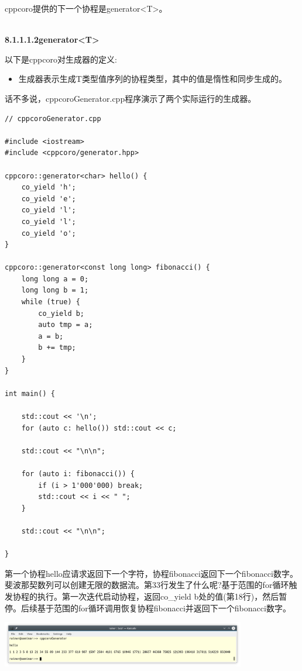 cppcoro提供的下一个协程是generator<T>。

\hspace*{\fill} \\ %
\noindent
\textbf{8.1.1.1.2\hspace{0.2cm}generator<T>}

以下是cppcoro对生成器的定义:

\begin{itemize}
\item 
生成器表示生成T类型值序列的协程类型，其中的值是惰性和同步生成的。
\end{itemize}

话不多说，cppcoroGenerator.cpp程序演示了两个实际运行的生成器。

\begin{lstlisting}[style=styleCXX]
// cppcoroGenerator.cpp

#include <iostream>
#include <cppcoro/generator.hpp>

cppcoro::generator<char> hello() {
	co_yield 'h';
	co_yield 'e';
	co_yield 'l';
	co_yield 'l';
	co_yield 'o';
}

cppcoro::generator<const long long> fibonacci() {
	long long a = 0;
	long long b = 1;
	while (true) {
		co_yield b;
		auto tmp = a;
		a = b;
		b += tmp;
	}
}

int main() {

	std::cout << '\n';
	for (auto c: hello()) std::cout << c;
	
	std::cout << "\n\n";
	
	for (auto i: fibonacci()) {
		if (i > 1'000'000) break;
		std::cout << i << " ";
	}
	
	std::cout << "\n\n";

}
\end{lstlisting}

第一个协程hello应请求返回下一个字符，协程fibonacci返回下一个fibonacci数字。斐波那契数列可以创建无限的数据流。第33行发生了什么呢?基于范围的for循环触发协程的执行。第一次迭代启动协程，返回co\_yield b处的值(第18行)，然后暂停。后续基于范围的for循环调用恢复协程fibonacci并返回下一个fibonacci数字。

\begin{center}
\includegraphics[width=0.8\textwidth]{content/5/chapter8/images/2.png}\\
\end{center}

